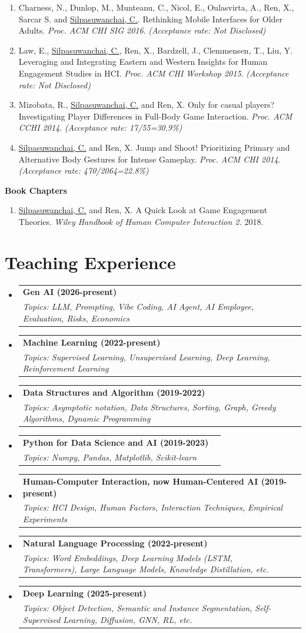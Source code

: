 \documentclass[letterpaper,11pt]{article}
\makeatletter
\newlength{\bibhang}
\newlength{\bibsep}
{\@listi \global\bibsep\itemsep \global\advance\bibsep by\parsep}
\newenvironment{bibsection}%
{\begin{enumerate}{}{%
			
			\setlength{\leftmargin}{\bibhang}%
			\setlength{\itemindent}{-\leftmargin}%
			\setlength{\itemsep}{\bibsep}%
			\setlength{\parsep}{\z@}%
			\setlength{\partopsep}{0pt}%
			\setlength{\topsep}{0pt}}}
	{\end{enumerate}}
\newcommand{\resumeSubheading}[4]{
  \vspace{-1pt}\item
    \begin{tabular*}{0.97\textwidth}{l@{\extracolsep{\fill}}r}
      \textbf{#1} & #2 \\
      \textit{\small#3} & \textit{\small #4} \\
    \end{tabular*}\vspace{-5pt}
}
\newcommand{\resumeSubHeadingListStart}{\begin{itemize}[leftmargin=*]}
\newcommand{\resumeSubHeadingListEnd}{\end{itemize}}
\makeatother
\begin{document}
\begin{bibsection}
	\item Charness, N., Dunlop, M., Munteanu, C., Nicol, E., Oulasvirta, A., Ren, X., Sarcar S.
	and \underline{Silpasuwanchai, C.}. Rethinking Mobile Interfaces for Older Adults. \textit{Proc. ACM CHI SIG 2016}.   \textit{(Acceptance rate: Not Disclosed)}
	\item Law, E., \underline{Silpasuwanchai, C.},  Ren, X., Bardzell, J., Clemmensen, T., Liu, Y. Leveraging and Integrating Eastern and Western Insights for Human Engagement Studies in HCI. \textit{Proc. ACM CHI Workshop 2015}.  \textit{(Acceptance rate: Not Disclosed)}
	\item Mizobata, R., \underline{Silpasuwanchai, C.} and Ren, X. Only for casual players? Investigating Player Differences in Full-Body Game Interaction. \textit{Proc. ACM CCHI 2014}.  \textit{(Acceptance rate: 17/55=30.9\%)}
	\item \underline{Silpasuwanchai, C.} and Ren, X. Jump and Shoot! Prioritizing Primary and
	Alternative Body Gestures for Intense Gameplay. \textit{Proc. ACM CHI 2014}. \textit{(Acceptance rate: 470/2064=22.8\%)}
\end{bibsection}

  \footnotesize
\textbf{Book Chapters}
\begin{bibsection}
	  	\footnotesize
	\item \underline{Silpasuwanchai, C.} and Ren, X. A Quick Look at Game Engagement Theories. \textit{Wiley Handbook of Human Computer Interaction 2.} 2018.
\end{bibsection}

\small
\section{Teaching Experience}
\resumeSubHeadingListStart
\resumeSubheading
{Gen AI (2026-present)}{}
{Topics: LLM, Prompting, Vibe Coding, AI Agent, AI Employee, Evaluation, Risks, Economics}{}
\resumeSubheading
{Machine Learning (2022-present)}{}
{Topics: Supervised Learning, Unsupervised Learning, Deep Learning, Reinforcement Learning}{}
\resumeSubheading
{Data Structures and Algorithm (2019-2022)}{}
{Topics: Asymptotic notation, Data Structures, Sorting, Graph, Greedy Algorithms, Dynamic Programming}{}
\resumeSubheading
{Python for Data Science and AI (2019-2023)}{}
{Topics: Numpy, Pandas, Matplotlib, Scikit-learn}{}
\resumeSubheading
{Human-Computer Interaction, now Human-Centered AI (2019-present)}{}
{Topics: HCI Design, Human Factors, Interaction Techniques, Empirical Experiments}{}
\resumeSubheading
{Natural Language Processing (2022-present)}{}
{Topics: Word Embeddings, Deep Learning Models (LSTM, Transformers),  Large Language Models,  Knowledge Distillation, etc.}{}
\resumeSubheading
{Deep Learning (2025-present)}{}
{Topics: Object Detection, Semantic and Instance Segmentation, Self-Supervised Learning, Diffusion, GNN, RL, etc.}{}
\resumeSubHeadingListEnd
\end{document}
